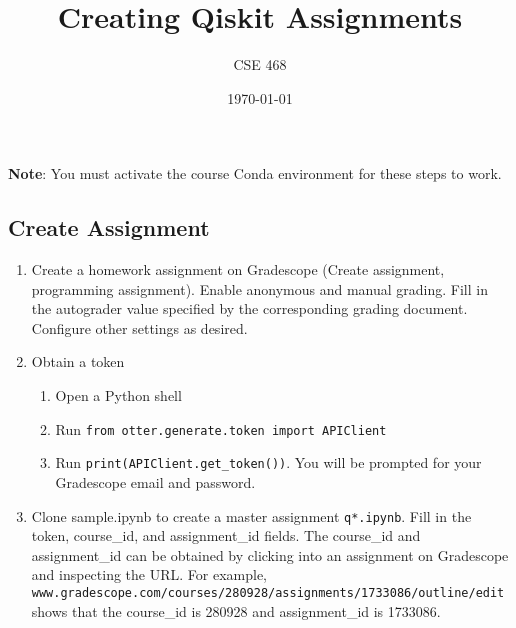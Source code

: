 \documentclass[12pt]{article}
\title{Creating Qiskit Assignments}
\author{CSE 468}
\date{\today}
\begin{document}
\maketitle

\noindent \textbf{Note}: You must activate the course Conda environment for these steps to work.

\subsection*{Create Assignment}
\begin{enumerate}[font=\bfseries]
    \item Create a homework assignment on Gradescope (Create assignment, programming assignment). Enable anonymous and manual grading. Fill in the autograder value specified by the corresponding grading document. Configure other settings as desired.
    \item Obtain a token
    \begin{enumerate}
        \item Open a Python shell
        \item Run \texttt{from otter.generate.token import APIClient}
        \item Run \texttt{print(APIClient.get\_token())}. You will be prompted for your Gradescope email and password.
    \end{enumerate}
    \item Clone sample.ipynb to create a master assignment \texttt{q*.ipynb}. Fill in the token, course\_id, and assignment\_id fields. The course\_id and assignment\_id can be obtained by clicking into an assignment on Gradescope and inspecting the URL.
    For example,\\ \texttt{www.gradescope.com/courses/280928/assignments/1733086/outline/edit} shows that the course\_id is 280928 and assignment\_id is 1733086.
\end{enumerate}
\newpage
\end{document}
